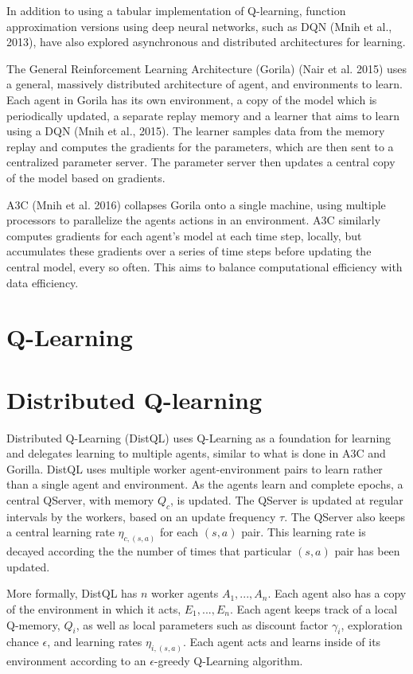 \documentclass[jair,twoside,11pt,theapa]{article}
\begin{document}
In addition to using a tabular implementation of Q-learning, function approximation versions using deep neural networks, such as DQN (Mnih et al., 2013), have also explored asynchronous and distributed architectures for learning. 

The General Reinforcement Learning Architecture (Gorila) (Nair et al. 2015)\nocite{Gorila} uses a general, massively distributed architecture of agent, and environments to learn. Each agent in Gorila has its own environment, a copy of the model which is periodically updated, a separate replay memory and a learner that aims to learn using a DQN (Mnih et al., 2015)\nocite{Mnih2015}. The learner samples data from the memory replay and computes the gradients for the parameters, which are then sent to a centralized parameter server. The parameter server then updates a central copy of the model based on gradients. 

A3C (Mnih et al. 2016)\nocite{A3C} collapses Gorila onto a single machine, using multiple processors to parallelize the agents actions in an environment. A3C similarly computes gradients for each agent's model at each time step, locally, but accumulates these gradients over a series of time steps before updating the central model, every so often. This aims to balance computational efficiency with data efficiency. 

\section{Q-Learning}
\label{Q-Learning}

\section{Distributed Q-learning} 
\label{algorithm}
Distributed Q-Learning (DistQL) uses Q-Learning as a foundation for learning and delegates learning to multiple agents, similar to what is done in A3C and Gorilla. DistQL uses multiple worker agent-environment pairs to learn rather than a single agent and environment. As the agents learn and complete epochs, a central QServer, with memory $Q_c$, is updated. The QServer is updated at regular intervals by the workers, based on an update frequency $\tau$. The QServer also keeps a central learning rate $\eta_{c,(s,a)}$ for each $(s,a)$ pair. This learning rate is decayed according the the number of times that particular $(s,a)$ pair has been updated. 

More formally, DistQL has $n$ worker agents $A_1,..., A_n$. Each agent also has a copy of the environment in which it acts, $E_1,...,E_n$. Each agent keeps track of a local Q-memory, $Q_i$, as well as local parameters such as discount factor $\gamma_i$, exploration chance $\epsilon$, and learning rates $\eta_{i,(s,a)}$. Each agent acts and learns inside of its environment according to an $\epsilon$-greedy Q-Learning algorithm.
\end{document}

